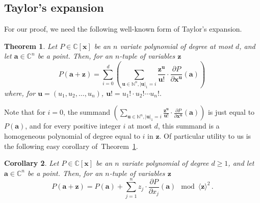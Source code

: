 \documentclass[10pt,a4paper]{article}
\newtheorem{theorem}{Theorem}
\newtheorem{corollary}[theorem]{Corollary}
\theoremstyle{definition}
\newcommand{\F}{\mathbb C}
\newcommand{\N}{\mathbb N}
\newcommand{\va}{\mathbf a}
\newcommand{\vu}{\mathbf u}
\newcommand{\vx}{\mathbf x}
\newcommand{\vz}{\mathbf z}
\begin{document}
\subsection{Taylor's expansion}
\label{sec:prelim-taylor}
For our proof, we need the following well-known form of Taylor's expansion. 
\begin{theorem}\label{thm:taylor}
Let $P \in \F[\vx]$ be an $n$ variate polynomial of degree at most $d$, and  let $\va \in \F^n$ be a point. Then, for an $n$-tuple of variables $\vz$
\[
P(\va + \vz) = \sum_{i = 0}^d \left(\sum_{\vu \in \N^{n}, |\vu|_1 = i} \frac{\vz^{\vu}}{\vu !} \cdot \frac{\partial P}{\partial \vx^{\vu}}\left(\va\right) \right) \, 
\]  
where, for $\vu = (u_1, u_2, \ldots, u_n)$, $\vu! = u_1!\cdot u_2!\cdots u_n!.$
\end{theorem} 
Note that for $i = 0$, the summand $\left(\sum_{\vu \in \N^{n}, |\vu|_1 = i} \frac{\vz^{\vu}}{\vu !} \cdot \frac{\partial P}{\partial \vx^{\vu}}\left(\va\right) \right)$ is just equal to $P(\va)$, and for every positive integer $i$ at most $d$, this summand is a homogeneous polynomial of degree equal to $i$ in $\vz$. Of particular utility to us is the following easy corollary of~Theorem~\ref{thm:taylor}. 
\begin{corollary}\label{cor:taylor truncation}
Let $P \in \F[\vx]$ be an $n$ variate polynomial of degree $d \geq 1$, and  let $\va \in \F^n$ be a point. Then, for an $n$-tuple of variables $\vz$
\[
P(\va + \vz) = P(\va) + \sum_{j = 1}^n z_j \cdot \frac{\partial P}{\partial x_j}(\va) \mod \langle \vz \rangle^2\, .
\]  

\end{corollary}
\end{document}
